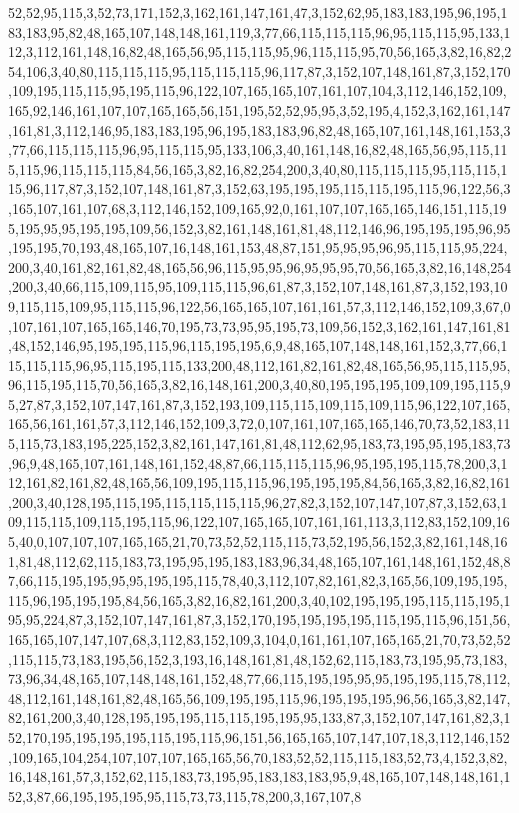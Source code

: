 52,52,95,115,3,52,73,171,152,3,162,161,147,161,47,3,152,62,95,183,183,195,96,195,183,183,95,82,48,165,107,148,148,161,119,3,77,66,115,115,115,96,95,115,115,95,133,112,3,112,161,148,16,82,48,165,56,95,115,115,95,96,115,115,95,70,56,165,3,82,16,82,254,106,3,40,80,115,115,115,95,115,115,115,96,117,87,3,152,107,148,161,87,3,152,170,109,195,115,115,95,195,115,96,122,107,165,165,107,161,107,104,3,112,146,152,109,165,92,146,161,107,107,165,165,56,151,195,52,52,95,95,3,52,195,4,152,3,162,161,147,161,81,3,112,146,95,183,183,195,96,195,183,183,96,82,48,165,107,161,148,161,153,3,77,66,115,115,115,96,95,115,115,95,133,106,3,40,161,148,16,82,48,165,56,95,115,115,115,96,115,115,115,84,56,165,3,82,16,82,254,200,3,40,80,115,115,115,95,115,115,115,96,117,87,3,152,107,148,161,87,3,152,63,195,195,195,115,115,195,115,96,122,56,3,165,107,161,107,68,3,112,146,152,109,165,92,0,161,107,107,165,165,146,151,115,195,195,95,95,195,195,109,56,152,3,82,161,148,161,81,48,112,146,96,195,195,195,96,95,195,195,70,193,48,165,107,16,148,161,153,48,87,151,95,95,95,96,95,115,115,95,224,200,3,40,161,82,161,82,48,165,56,96,115,95,95,96,95,95,95,70,56,165,3,82,16,148,254,200,3,40,66,115,109,115,95,109,115,115,96,61,87,3,152,107,148,161,87,3,152,193,109,115,115,109,95,115,115,96,122,56,165,165,107,161,161,57,3,112,146,152,109,3,67,0,107,161,107,165,165,146,70,195,73,73,95,95,195,73,109,56,152,3,162,161,147,161,81,48,152,146,95,195,195,115,96,115,195,195,6,9,48,165,107,148,148,161,152,3,77,66,115,115,115,96,95,115,195,115,133,200,48,112,161,82,161,82,48,165,56,95,115,115,95,96,115,195,115,70,56,165,3,82,16,148,161,200,3,40,80,195,195,195,109,109,195,115,95,27,87,3,152,107,147,161,87,3,152,193,109,115,115,109,115,109,115,96,122,107,165,165,56,161,161,57,3,112,146,152,109,3,72,0,107,161,107,165,165,146,70,73,52,183,115,115,73,183,195,225,152,3,82,161,147,161,81,48,112,62,95,183,73,195,95,195,183,73,96,9,48,165,107,161,148,161,152,48,87,66,115,115,115,96,95,195,195,115,78,200,3,112,161,82,161,82,48,165,56,109,195,115,115,96,195,195,195,84,56,165,3,82,16,82,161,200,3,40,128,195,115,195,115,115,115,115,96,27,82,3,152,107,147,107,87,3,152,63,109,115,115,109,115,195,115,96,122,107,165,165,107,161,161,113,3,112,83,152,109,165,40,0,107,107,107,165,165,21,70,73,52,52,115,115,73,52,195,56,152,3,82,161,148,161,81,48,112,62,115,183,73,195,95,195,183,183,96,34,48,165,107,161,148,161,152,48,87,66,115,195,195,95,95,195,195,115,78,40,3,112,107,82,161,82,3,165,56,109,195,195,115,96,195,195,195,84,56,165,3,82,16,82,161,200,3,40,102,195,195,195,115,115,195,195,95,224,87,3,152,107,147,161,87,3,152,170,195,195,195,195,115,195,115,96,151,56,165,165,107,147,107,68,3,112,83,152,109,3,104,0,161,161,107,165,165,21,70,73,52,52,115,115,73,183,195,56,152,3,193,16,148,161,81,48,152,62,115,183,73,195,95,73,183,73,96,34,48,165,107,148,148,161,152,48,77,66,115,195,195,95,95,195,195,115,78,112,48,112,161,148,161,82,48,165,56,109,195,195,115,96,195,195,195,96,56,165,3,82,147,82,161,200,3,40,128,195,195,195,115,115,195,195,95,133,87,3,152,107,147,161,82,3,152,170,195,195,195,195,115,195,115,96,151,56,165,165,107,147,107,18,3,112,146,152,109,165,104,254,107,107,107,165,165,56,70,183,52,52,115,115,183,52,73,4,152,3,82,16,148,161,57,3,152,62,115,183,73,195,95,183,183,183,95,9,48,165,107,148,148,161,152,3,87,66,195,195,195,95,115,73,73,115,78,200,3,167,107,8